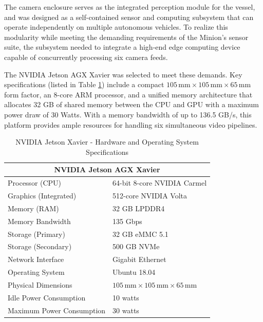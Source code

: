 \documentclass{erauthesis}
\begin{document}
The camera enclosure serves as the integrated perception module for the vessel, and was designed as a self-contained sensor and computing subsystem that can operate independently on multiple autonomous vehicles.
To realize this modularity while meeting the demanding requirements of the Minion’s sensor suite, the subsystem needed to integrate a high-end edge computing device capable of concurrently processing six camera feeds.

The NVIDIA Jetson AGX Xavier was selected to meet these demands.
Key specifications (listed in Table \ref{table:Xavier_hardware}) include a compact $105 \,\text{mm} \times 105 \,\text{mm} \times 65 \,\text{mm}$ form factor, an 8-core ARM processor, and a unified memory architecture that allocates 32 GB of shared memory between the CPU and GPU with a maximum power draw of 30 Watts.
With a memory bandwidth of up to 136.5 GB/s, this platform provides ample resources for handling six simultaneous video pipelines.

\begin{table}[htpb]
\centering
\begin{tabular}{ll}
\hline
\multicolumn{2}{c}{NVIDIA Jetson AGX Xavier} \\
\hline
\hline
Processor (CPU) & 64-bit 8-core NVIDIA Carmel \\
Graphics (Integrated) & 512-core NVIDIA Volta \\
Memory (RAM) & 32 GB LPDDR4 \\
Memory Bandwidth & 135 Gbps \\
Storage (Primary) & 32 GB eMMC 5.1 \\
Storage (Secondary) & 500 GB NVMe \\
Network Interface & Gigabit Ethernet \\
Operating System & Ubuntu 18.04 \\
Physical Dimensions & $105 \,\text{mm} \times 105 \,\text{mm} \times 65 \,\text{mm}$ \\
Idle Power Consumption & 10 watts\\
Maximum Power Consumption & 30 watts \\
\hline
\end{tabular}
\caption{NVIDIA Jetson Xavier - Hardware and Operating System Specifications}
\label{table:Xavier_hardware}
\end{table}
\end{document}
